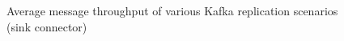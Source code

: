 \begin{figure}[htbp]
{    }
    \hfill
    \centering
    \hfill
    \caption{Average message throughput of various Kafka replication scenarios (sink connector)}
    \label{fig:appendix02:results:sinkmessages}
\end{figure}

